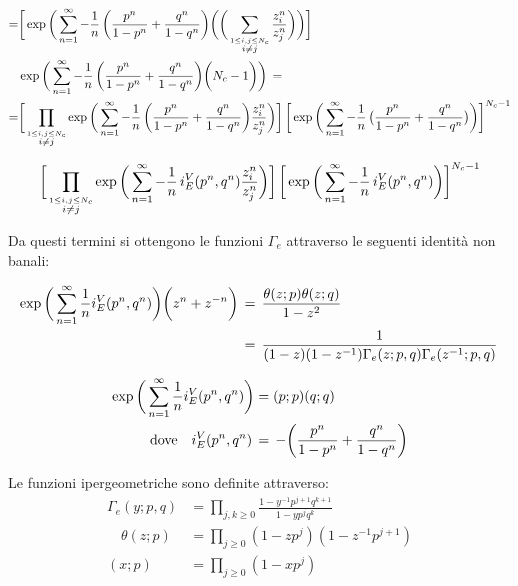\documentclass[a4paper,12pt]{article}
\begin{document}
  \begin{align*}
    =&\bigg[ \exp \bigg( \sum_{n=1}^{\infty} - {1 \over n} \, \bigg( {p^n \over 1-p^n} + {q^n \over 1-q^n} \bigg)  \bigg( \bigg( \sum_{\overset{ 1 \leq i,j \leq N_c}{i \neq j}}  {z_i^n \over z_j^n} \bigg) \bigg)\bigg] \\
	&    \exp \bigg( \sum_{n=1}^{\infty} - {1 \over n} \, \bigg( {p^n \over 1-p^n} + {q^n \over 1-q^n} \bigg)  \bigg( N_c - 1 \bigg) \bigg) \, = \\
=& \bigg[\prod_{\overset{ 1 \leq i,j \leq N_c}{i\neq j}} \exp \bigg( \sum_{n=1}^{\infty} - {1 \over n} \, \bigg( {p^n \over 1-p^n} + {q^n \over 1-q^n} \bigg)   {z_i^n \over z_j^n}\bigg) \bigg] \,  
\bigg[ \exp \bigg( \sum_{n=1}^{\infty} - {1 \over n} \, \big( {p^n \over 1-p^n} + {q^n \over 1-q^n} \big) \bigg) \bigg] ^{N_c-1}
\end{align*}

\begin{equation}
\bigg[\prod_{\overset{ 1 \leq i,j \leq N_c}{i\neq j}} \exp \bigg( \sum_{n=1}^{\infty} - {1 \over n} \, i_E^V(p^n,q^n)  {z_i^n \over z_j^n}\bigg) \bigg] \,  
\bigg[ \exp \bigg( \sum_{n=1}^{\infty} - {1 \over n} \,  i_E^V(p^n,q^n) \bigg) \bigg] ^{N_c-1}
\end{equation}

Da questi termini si ottengono le funzioni $\Gamma_e$ attraverso le seguenti identità non banali:

\begin{align}
\exp \bigg( \sum_{n=1}^{\infty} {1 \over n} i_E^{V} (p^n,q^n) \bigg) \bigg( z^n + z^{-n} \bigg) \,& = 
\,  \frac{ \theta ( z;p) \theta (z;q) }{ 1-z^2 } \\
& =  \, \frac{1}{ ( 1 - z ) ( 1 - z^{-1}) \Gamma_e( z;p,q) \Gamma_e( z^{-1}; p,q)} \, 
\label{Gamma_eVectorAdjoint} 
\end{align}

\begin{align}
  \exp \bigg( \sum_{n=1}^{\infty} {1 \over n} i_E^{V} (p^n,q^n) \bigg)  &= (p;p) (q;q) \,
  \label{Gamma_eVector} \\
 \mbox{dove} \quad i_E^V(p^n,q^n) \, &= \, - \bigg( {p^n \over 1-p^n} + {q^n \over 1-q^n} \bigg) 
\end{align}

 Le funzioni ipergeometriche sono definite attraverso:
 $$
 \begin{aligned}
   \Gamma_e (y;p,q) &= \prod_{j,k \geq 0} \frac{ 1 - y^{-1} p^{j+1} q^{k+1}}{ 1 - y p^j q^k}\\
  \quad \theta(z;p) &= \prod_{j \geq 0 } (1- z p^j) ( 1- z^{-1}p^{j+1}) \\
  (x;p) &= \prod_{j \geq 0} ( 1- xp^j)
  \end{aligned}
$$
\end{document}
